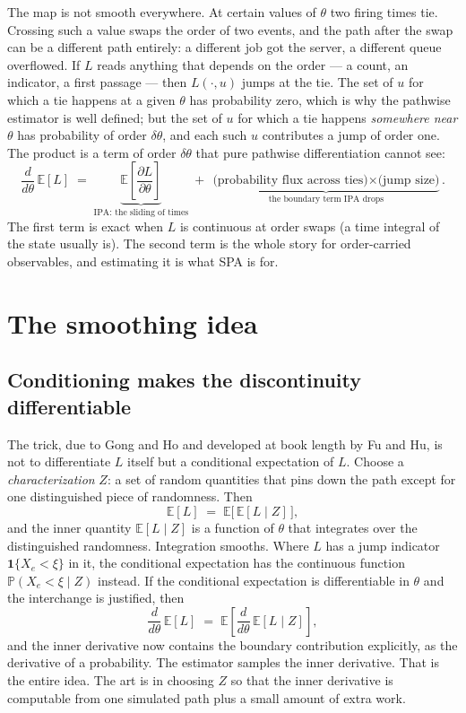 \documentclass[11pt]{article}
\newcommand{\E}{\mathbb{E}}
\newcommand{\Prob}{\mathbb{P}}
\begin{document}
The map is not smooth everywhere. At certain values of $\theta$ two
firing times tie. Crossing such a value swaps the order of two events,
and the path after the swap can be a different path entirely: a different
job got the server, a different queue overflowed. If $L$ reads anything
that depends on the order --- a count, an indicator, a first passage ---
then $L(\cdot, u)$ jumps at the tie. The set of $u$ for which a tie
happens at a given $\theta$ has probability zero, which is why the
pathwise estimator is well defined; but the set of $u$ for which a tie
happens \emph{somewhere near} $\theta$ has probability of order
$\delta\theta$, and each such $u$ contributes a jump of order one. The
product is a term of order $\delta\theta$ that pure pathwise
differentiation cannot see:
\[
\frac{d}{d\theta}\,\E[L]
\;=\;
\underbrace{\E\!\left[\frac{\partial L}{\partial \theta}\right]}_{\text{IPA: the sliding of times}}
\;+\;
\underbrace{\text{(probability flux across ties)} \times \text{(jump size)}}_{\text{the boundary term IPA drops}} .
\]
The first term is exact when $L$ is continuous at order swaps (a time
integral of the state usually is). The second term is the whole story for
order-carried observables, and estimating it is what SPA is for.

\section{The smoothing idea}

\subsection{Conditioning makes the discontinuity differentiable}

The trick, due to Gong and Ho and developed at book length by Fu and Hu,
is not to differentiate $L$ itself but a conditional expectation of $L$.
Choose a \emph{characterization} $Z$: a set of random quantities that
pins down the path except for one distinguished piece of randomness.
Then
\[
\E[L] \;=\; \E\bigl[\,\E[L \mid Z]\,\bigr],
\]
and the inner quantity $\E[L \mid Z]$ is a function of $\theta$ that
integrates over the distinguished randomness. Integration smooths. Where
$L$ has a jump indicator $\mathbf{1}\{X_e < \xi\}$ in it, the conditional
expectation has the continuous function $\Prob(X_e < \xi \mid Z)$
instead. If the conditional expectation is differentiable in $\theta$ and
the interchange is justified, then
\[
\frac{d}{d\theta}\,\E[L]
\;=\;
\E\!\left[\frac{d}{d\theta}\,\E[L \mid Z]\right],
\]
and the inner derivative now contains the boundary contribution
explicitly, as the derivative of a probability. The estimator samples the
inner derivative. That is the entire idea. The art is in choosing $Z$ so
that the inner derivative is computable from one simulated path plus a
small amount of extra work.
\end{document}
